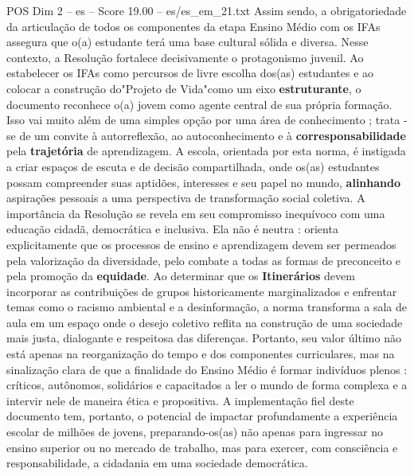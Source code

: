 \begin{textsample}{POS Dim 2 – es – Score 19.00 – es/es\_em\_21.txt}
Assim sendo, a obrigatoriedade da articulação de todos os componentes da etapa Ensino Médio com os IFAs assegura que o(a) estudante terá uma base cultural sólida e diversa.
Nesse contexto, a Resolução fortalece decisivamente o protagonismo juvenil.
Ao estabelecer os IFAs como percursos de livre escolha dos(as) estudantes e ao colocar a construção do"Projeto de Vida"como um eixo \textbf{estruturante}, o documento reconhece o(a) jovem como agente central de sua própria formação.
Isso vai muito além de uma simples opção por uma área de conhecimento ; trata -se de um convite à autorreflexão, ao autoconhecimento e à \textbf{corresponsabilidade} pela \textbf{trajetória} de aprendizagem.
A escola, orientada por esta norma, é instigada a criar espaços de escuta e de decisão compartilhada, onde os(as) estudantes possam compreender suas aptidões, interesses e seu papel no mundo, \textbf{alinhando} aspirações pessoais a uma perspectiva de transformação social coletiva.
A importância da Resolução se revela em seu compromisso inequívoco com uma educação cidadã, democrática e inclusiva.
Ela não é neutra : orienta explicitamente que os processos de ensino e aprendizagem devem ser permeados pela valorização da diversidade, pelo combate a todas as formas de preconceito e pela promoção da \textbf{equidade}.
Ao determinar que os \textbf{Itinerários} devem incorporar as contribuições de grupos historicamente marginalizados e enfrentar temas como o racismo ambiental e a desinformação, a norma transforma a sala de aula em um espaço onde o desejo coletivo reflita na construção de uma sociedade mais justa, dialogante e respeitosa das diferenças.
Portanto, seu valor último não está apenas na reorganização do tempo e dos componentes curriculares, mas na sinalização clara de que a finalidade do Ensino Médio é formar indivíduos plenos : críticos, autônomos, solidários e capacitados a ler o mundo de forma complexa e a intervir nele de maneira ética e propositiva.
A implementação fiel deste documento tem, portanto, o potencial de impactar profundamente a experiência escolar de milhões de jovens, preparando-os(as) não apenas para ingressar no ensino superior ou no mercado de trabalho, mas para exercer, com consciência e responsabilidade, a cidadania em uma sociedade democrática.

\end{textsample}
